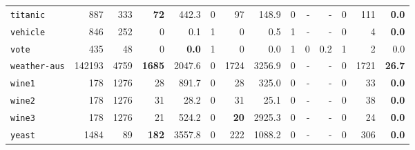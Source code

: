 \begin{tabular}{lccrrrrrrrrrrr}
\texttt{titanic} & \multicolumn{1}{r}{887} & \multicolumn{1}{r}{333}  & \textbf{72} & 442.3 & 0 & 97 & 148.9 & 0 & - & - & 0 & 111 & \textbf{0.0}\\
\texttt{vehicle} & \multicolumn{1}{r}{846} & \multicolumn{1}{r}{252}  & 0 & 0.1 & 1 & 0 & 0.5 & 1 & - & - & 0 & 4 & \textbf{0.0}\\
\texttt{vote} & \multicolumn{1}{r}{435} & \multicolumn{1}{r}{48}  & 0 & \textbf{0.0} & 1 & 0 & 0.0 & 1 & 0 & 0.2 & 1 & 2 & 0.0\\
\texttt{weather-aus} & \multicolumn{1}{r}{142193} & \multicolumn{1}{r}{4759}  & \textbf{1685} & 2047.6 & 0 & 1724 & 3256.9 & 0 & - & - & 0 & 1721 & \textbf{26.7}\\
\texttt{wine1} & \multicolumn{1}{r}{178} & \multicolumn{1}{r}{1276}  & 28 & 891.7 & 0 & 28 & 325.0 & 0 & - & - & 0 & 33 & \textbf{0.0}\\
\texttt{wine2} & \multicolumn{1}{r}{178} & \multicolumn{1}{r}{1276}  & 31 & 28.2 & 0 & 31 & 25.1 & 0 & - & - & 0 & 38 & \textbf{0.0}\\
\texttt{wine3} & \multicolumn{1}{r}{178} & \multicolumn{1}{r}{1276}  & 21 & 524.2 & 0 & \textbf{20} & 2925.3 & 0 & - & - & 0 & 24 & \textbf{0.0}\\
\texttt{yeast} & \multicolumn{1}{r}{1484} & \multicolumn{1}{r}{89}  & \textbf{182} & 3557.8 & 0 & 222 & 1088.2 & 0 & - & - & 0 & 306 & \textbf{0.0}\\
\bottomrule
\end{tabular}
